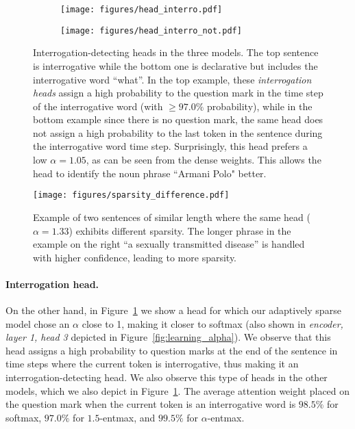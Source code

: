 \documentclass[11pt,a4paper]{article}
\newcommand{\figref}[1]{Figure~\ref{fig:#1}}
\newcommand*\entmaxtext{entmax\xspace}
\begin{document}
\begin{figure}[t]
    \begin{subfigure}[b]{\columnwidth}
    \texttt{[image: figures/head\_interro.pdf]}
    \end{subfigure}
    \begin{subfigure}[b]{\columnwidth}
        \texttt{[image: figures/head\_interro\_not.pdf]}
    \end{subfigure}
\caption{Interrogation-detecting heads in the three models. The top sentence
is interrogative while the bottom one is declarative but includes the
interrogative word ``what''. In the top example, these {\it
interrogation heads} assign a high probability to the question mark
in the time step of the interrogative word (with $\geq 97.0\%$
probability), while in the bottom example since there is no question
mark, the same head does not assign a high probability to the last
token in the sentence during the interrogative word time step.
Surprisingly, this head prefers a low $\alpha=1.05$, as can be seen
from the dense weights. This allows the head to identify the noun
phrase ``Armani Polo" better.}
\label{fig:head_interro}
\end{figure}

\begin{figure}[t]
    \texttt{[image: figures/sparsity\_difference.pdf]}
\caption{Example of two sentences of similar length where the same head
($\alpha=1.33$) exhibits different sparsity. The longer phrase in the
example on the right ``a sexually transmitted disease'' is handled
with higher confidence, leading to more sparsity.
}
\label{fig:sparsity_difference}
\end{figure}

\paragraph{Interrogation head.}
On the other hand, in \figref{head_interro} we show a head for which our
adaptively sparse model chose an $\alpha$ close to 1, making it
closer to softmax (also shown in {\it encoder, layer 1, head 3}
depicted in \figref{learning_alpha}). We observe that this head
assigns a high probability to question marks at the end of the
sentence in time steps where the current token is interrogative, thus
making it an interrogation-detecting head. We also observe this type
of heads in the other models, which we also depict in
\figref{head_interro}. The average attention weight placed on the
question mark when the current token is an interrogative word is
$98.5\%$ for softmax, $97.0\%$ for $1.5$-\entmaxtext, and $99.5\%$
for $\alpha$-\entmaxtext.
\end{document}
